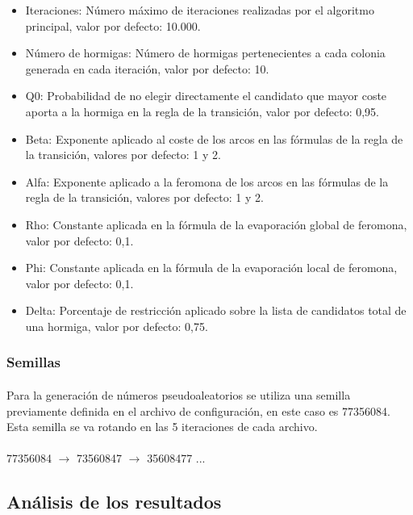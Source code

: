 		\begin{itemize}
			
			\item Iteraciones:  Número máximo de iteraciones realizadas por el algoritmo principal, valor por defecto: 10.000.
			\item Número de hormigas: Número de hormigas pertenecientes a cada colonia generada en cada iteración, valor por defecto: 10.
			\item Q0: Probabilidad de no elegir directamente el candidato que mayor coste aporta a la hormiga en la regla de la transición, valor por defecto: 0,95.
			\item Beta: Exponente aplicado al coste de los arcos en las fórmulas de la regla de la transición, valores por defecto: 1 y 2.
			\item Alfa: Exponente aplicado a la feromona de los arcos en las fórmulas de la regla de la transición, valores por defecto: 1 y 2.
			\item Rho: Constante aplicada en la fórmula de la evaporación global de feromona, valor por defecto: 0,1.
			\item Phi: Constante aplicada en la fórmula de la evaporación local de feromona, valor por defecto: 0,1.
			\item Delta: Porcentaje de restricción aplicado sobre la lista de candidatos total de una hormiga, valor por defecto: 0,75.
			
		\end{itemize}
	\subsubsection{Semillas}
	
	\paragraph{}Para la generación de números pseudoaleatorios se utiliza una semilla previamente definida en el archivo de configuración, en este caso es 77356084. Esta semilla se va rotando en las 5 iteraciones de cada archivo.
	
	
	\paragraph{} 77356084 $\rightarrow$ 73560847 $\rightarrow$ 35608477  ...
	
	
	\subsection{Análisis de los resultados}
		
